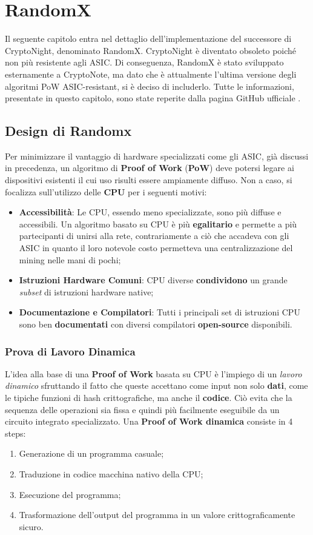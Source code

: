 \chapter{RandomX}
Il seguente capitolo entra nel dettaglio dell'implementazione del successore di CryptoNight, denominato RandomX. CryptoNight è diventato obsoleto poiché non più resistente agli ASIC. Di conseguenza, RandomX è stato sviluppato esternamente a CryptoNote, ma dato che è attualmente l'ultima versione degli algoritmi PoW ASIC-resistant, si è deciso di includerlo. 
Tutte le informazioni, presentate in questo capitolo, sono state reperite dalla pagina GitHub ufficiale \cite{randomx}.

\section{Design di Randomx}
Per minimizzare il vantaggio di hardware specializzati come gli ASIC, già discussi in precedenza, un algoritmo di \textbf{Proof of Work} (\textbf{PoW}) deve potersi legare ai dispositivi esistenti il cui uso risulti essere ampiamente diffuso. Non a caso, si focalizza sull'utilizzo delle \textbf{CPU} per i seguenti motivi:

\begin{itemize}
    \item \textbf{Accessibilità}: Le CPU, essendo meno specializzate, sono più diffuse e accessibili. Un algoritmo basato su CPU è più \textbf{egalitario} e permette a più partecipanti di unirsi alla rete, contrariamente a ciò che accadeva con gli ASIC in quanto il loro notevole costo permetteva una centralizzazione del mining nelle mani di pochi;
    \item \textbf{Istruzioni Hardware Comuni}: CPU diverse \textbf{condividono} un grande \textit{subset} di istruzioni hardware native;
    \item \textbf{Documentazione e Compilatori}: Tutti i principali set di istruzioni CPU sono ben \textbf{documentati} con diversi compilatori \textbf{open-source} disponibili.
\end{itemize}

\subsection{Prova di Lavoro Dinamica} 
L'idea alla base di una \textbf{Proof of Work} basata su CPU è l'impiego di un \textit{lavoro dinamico} sfruttando il fatto che queste accettano come input non solo \textbf{dati}, come le tipiche funzioni di hash crittografiche, ma anche il \textbf{codice}. Ciò evita che la sequenza delle operazioni sia fissa e quindi più facilmente eseguibile da un circuito integrato specializzato. Una \textbf{Proof of Work dinamica} consiste in 4 steps:
\begin{enumerate}
    \item Generazione di un programma casuale;
    \item Traduzione in codice macchina nativo della CPU;
    \item Esecuzione del programma;
    \item Trasformazione dell'output del programma in un valore crittograficamente sicuro.
\end{enumerate}

